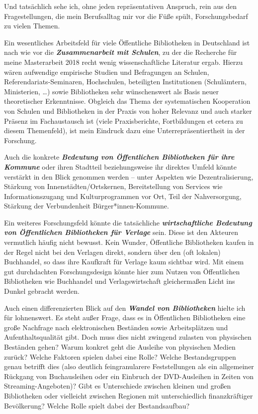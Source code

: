 \documentclass[a4paper,
fontsize=11pt,
oneside,
numbers=noperiodatend,
parskip=half-,
bibliography=totoc,
final
]{scrartcl}
\begin{document}
Und tatsächlich sehe ich, ohne jeden repräsentativen Anspruch, rein aus
den Fragestellungen, die mein Berufsalltag mir vor die Füße spült,
Forschungsbedarf zu vielen Themen.

Ein wesentliches Arbeitsfeld für viele Öffentliche Bibliotheken in
Deutschland ist nach wie vor die \textbf{\emph{Zusammenarbeit mit
Schulen}}, zu der die Recherche für meine Masterarbeit 2018 recht wenig
wissenschaftliche Literatur ergab. Hierzu wären aufwendige empirische
Studien und Befragungen an Schulen, Referendariats-Seminaren,
Hochschulen, beteiligten Institutionen (Schulämtern, Ministerien,
\ldots) sowie Bibliotheken sehr wünschenswert als Basis neuer
theoretischer Erkenntnisse. Obgleich das Thema der systematischen
Kooperation von Schulen und Bibliotheken in der Praxis von hoher
Relevanz und auch starker Präsenz im Fachaustausch ist (viele
Praxisberichte, Fortbildungen et cetera zu diesem Themenfeld), ist mein
Eindruck dazu eine Unterrepräsentiertheit in der Forschung.

Auch die konkrete \textbf{\emph{Bedeutung von Öffentlichen Bibliotheken
für ihre Kommune}} oder ihren Stadtteil beziehungsweise ihr direktes
Umfeld könnte verstärkt in den Blick genommen werden -- unter Aspekten
wie Dezentralisierung, Stärkung von Innenstädten/Ortskernen,
Bereitstellung von Services wie Informationszugang und Kulturprogrammen
vor Ort, Teil der Nahversorgung, Stärkung der Verbundenheit
Bürger*innen-Kommune.

Ein weiteres Forschungsfeld könnte die tatsächliche
\textbf{\emph{wirtschaftliche Bedeutung von Öffentlichen Bibliotheken
für Verlage}} sein. Diese ist den Akteuren vermutlich häufig nicht
bewusst. Kein Wunder, Öffentliche Bibliotheken kaufen in der Regel nicht
bei den Verlagen direkt, sondern über den (oft lokalen) Buchhandel, so
dass ihre Kaufkraft für Verlage kaum sichtbar wird. Mit einem gut
durchdachten Forschungsdesign könnte hier zum Nutzen von Öffentlichen
Bibliotheken wie Buchhandel und Verlagswirtschaft gleichermaßen Licht
ins Dunkel gebracht werden.

Auch einen differenzierten Blick auf den \textbf{\emph{Wandel von
Bibliotheken}} hielte ich für lohnenswert. Es steht außer Frage, dass es
in Öffentlichen Bibliotheken eine große Nachfrage nach elektronischen
Beständen sowie Arbeitsplätzen und Aufenthaltsqualität gibt. Doch muss
dies nicht zwingend zulasten von physischen Beständen gehen? Warum
konkret geht die Ausleihe von physischen Medien zurück? Welche Faktoren
spielen dabei eine Rolle? Welche Bestandsgruppen genau betrifft dies
(also deutlich feingranularere Feststellungen als ein allgemeiner
Rückgang von Buchausleihen oder ein Einbruch der
DVD-Ausleihen in Zeiten von Streaming-Angeboten)? Gibt es Unterschiede
zwischen kleinen und großen Bibliotheken oder vielleicht zwischen
Regionen mit unterschiedlich finanzkräftiger Bevölkerung? Welche Rolle
spielt dabei der Bestandsaufbau?
\end{document}
